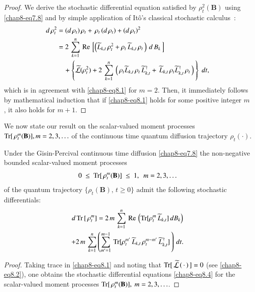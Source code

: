 \begin{proof}
We derive the stochastic differential equation satisfied by $\rho_t^2(\mathbf{B})$  using \eqref{chap8-eq7.8} and by simple application of It\^o's classical stochastic calculus~\cite{chap8-key38}: 
\eject
\begin{align}
d\, \rho_t^2 & = (d\, \rho_t)\, \rho_t +\, \rho_t\, (d\, \rho_t)+ (d\, \rho_t)^2\nonumber \\ 
&= 2\, \sum_{k=1}^{n}\,  {\rm Re}\, \left[\left(\widetilde{L}_{k,t}\, \rho^{2}_t + \rho_t\, \widetilde{L}_{k,t}\, \rho_t\,\right)\, d\, B_{k}\, \right] \nonumber \\
&\quad + \left\{ \widetilde{\mathcal{L}}(\rho_t^2) + 2\, \sum_{k=1}^{n}\,\left(\, \rho_t \widetilde{L}_{k,t}\, \rho_t\, \widetilde{L}^\dag_{k,t} + \,   \widetilde{L}_{k,t}\,\rho_t \widetilde{L}^\dag_{k,t}\, \rho_t  \, \right) \, \right\}\  dt,  \label{chap8-eq8.3} 
\end{align}
which is in agreement with \eqref{chap8-eq8.1} for $m=2$. Then, it immediately follows by mathematical induction that if \eqref{chap8-eq8.1} holds for some positive integer $m$, it also holds for $m+1$. 
\end{proof}

We now state our result on the scalar-valued moment processes ${\rm Tr}[\, \rho_t^m(\mathbf{B})], m=2,3,\ldots$  of the continuous time quantum diffusion trajectory $\rho_t(\cdot)$.

\begin{thm}\label{chap8-thm4}
Under the Gisin-Percival continuous time diffusion \eqref{chap8-eq7.8} the non-negative bounded scalar-valued  moment processes  
$$0~\leq~{\rm Tr}[\, \rho_t^m(\mathbf{B})]~\leq~ 1,\ \  m=2,3,\ldots$$ 
of the quantum trajectory $\{\rho_t(\mathbf{B}),\, t\geq 0\}$ admit the following stochastic differentials:
\begin{multline}
d\, {\rm Tr}\,[\, \rho_t^m] = 2\, m\, \sum_{k=1}^n\, {\rm Re}\,\left( {\rm Tr}[\rho_t^m\, \widetilde{L}_{k,t}]\, dB_{k}\right)  \\
+ 2\, m\, \sum_{k=1}^n\left(\sum_{m'=1}^{m-1}\, {\rm Tr}[\rho_t^{m'}\, \widetilde{L}_{k,t}\, \rho_t^{m-m'}\, \widetilde{L}_{k,t}^\dag]\,\right)\, dt.  \label{chap8-eq8.4}
\end{multline}   
\end{thm}

\begin{proof}
Taking trace in \eqref{chap8-eq8.1} and  noting   that ${\rm Tr}[\,\widetilde{\mathcal{L}}\,(\,\cdot\,)\,]=0$ (see \eqref{chap8-eq8.2}), one obtains the stochastic differential equations \eqref{chap8-eq8.4} for the scalar-valued moment processes ${\rm Tr}[\, \rho_t^m(\mathbf{B})],\ m=2,3,\ldots$. 
\end{proof}

